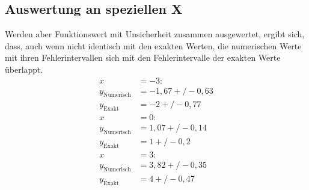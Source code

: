 \subsection*{Auswertung an speziellen X}
\label{sub:Auswertung an speziellen X}
Werden aber Funktionswert mit Unsicherheit zusammen ausgewertet, ergibt sich, dass, auch wenn nicht identisch mit den exakten Werten,
die numerischen Werte mit ihren Fehlerintervallen sich mit den Fehlerintervalle der exakten Werte überlappt.
\begin{align}
    x  &=  -3 :\nonumber\\
        y_{\text{Numerisch}}    &=  -1,67 +/- 0,63\nonumber\\
        y_{\text{Exakt}}        &=  -2 +/- 0,77\nonumber\\
    x  &=  0 :\nonumber\\
        y_{\text{Numerisch}}    &=  1,07 +/- 0,14\nonumber\\
        y_{\text{Exakt}}        &=  1 +/- 0,2\nonumber\\
    x  &=  3 :\nonumber\\
        y_{\text{Numerisch}}    &=  3,82 +/- 0,35\nonumber\\
        y_{\text{Exakt}}        &=  4 +/- 0,47\nonumber\\
\end{align}